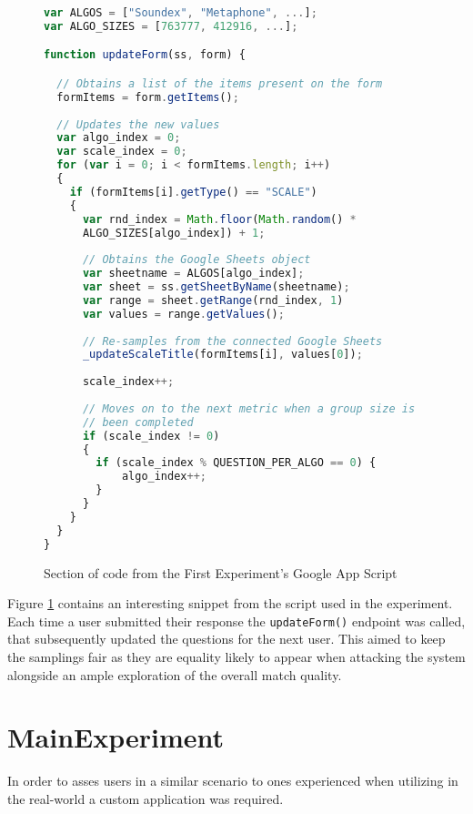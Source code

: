 \begin{figure}[!h]
\begin{lstlisting}[frame=single, language=Javascript]
var ALGOS = ["Soundex", "Metaphone", ...];
var ALGO_SIZES = [763777, 412916, ...];

function updateForm(ss, form) {

  // Obtains a list of the items present on the form
  formItems = form.getItems();
  
  // Updates the new values
  var algo_index = 0;
  var scale_index = 0;
  for (var i = 0; i < formItems.length; i++)
  {
    if (formItems[i].getType() == "SCALE")
    {
      var rnd_index = Math.floor(Math.random() * 
      ALGO_SIZES[algo_index]) + 1;    
      
      // Obtains the Google Sheets object
      var sheetname = ALGOS[algo_index];
      var sheet = ss.getSheetByName(sheetname);
      var range = sheet.getRange(rnd_index, 1)
      var values = range.getValues();
           
      // Re-samples from the connected Google Sheets
      _updateScaleTitle(formItems[i], values[0]);
      
      scale_index++;
      
      // Moves on to the next metric when a group size is
      // been completed
      if (scale_index != 0)
      {
        if (scale_index % QUESTION_PER_ALGO == 0) {
            algo_index++;
        }
      }
    }
  }
}
\end{lstlisting}
\caption{Section of code from the First Experiment's Google App Script}
\label{fig:GoogleAppScript}
\end{figure}

Figure \ref{fig:GoogleAppScript} contains an interesting snippet from the script used in the experiment. Each time a user submitted their response the \verb|updateForm()| endpoint was called, that subsequently updated the questions for the next user. This aimed to keep the samplings fair as they are equality likely to appear when attacking the system alongside an ample exploration of the overall match quality.

\section{MainExperiment}
In order to asses users in a similar scenario to ones experienced when utilizing \pep in the real-world a custom application was required. 


